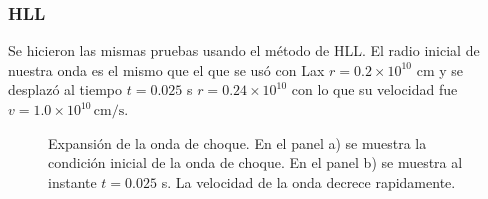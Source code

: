 \documentclass[12pt,a4paper]{book}
\begin{document}
\subsubsection{HLL}


Se hicieron las mismas pruebas usando el método de HLL. El radio inicial de nuestra onda es el mismo que el que se usó con Lax $r = 0.2 \times 10^{10}$ cm y se desplazó al tiempo $t=0.025$ s $r =  0.24 \times 10^{10}$ con lo que su velocidad fue $v = 1.0 \times 10^{10} \, \mathrm{cm}/\mathrm{s}$. 

\begin{figure}[H] 	
\centering
{}
\caption{Expansión de la onda de choque. En el panel a) se muestra la condición inicial de la onda de choque. En el panel b) se muestra al instante $t = 0.025$ s. La velocidad de la onda decrece rapidamente.} \label{fig:bwhll-rel-centrado}
\end{figure}
\end{document}
